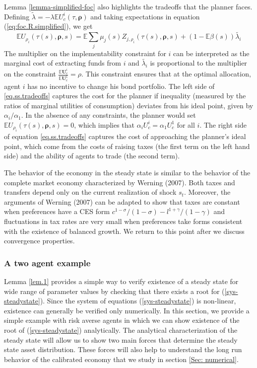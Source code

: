 \documentclass[thmsb,11pt]{article}
\begin{document}
Lemma \ref{lemma-simplified-foc} also highlights the tradeoffs that the planner faces.  Defining $\tilde{\lambda}=-\lambda \mathbb{E} U^i_c(\tau,\bm \rho)$ and taking expectations in equation (\ref{eq:foc.R.simplified}), we get
\begin{equation}
\label{eq.ss.tradeoffs}
\mathbb{E} U_{\rho_i}(\tau(s),\bm \rho,s)= \mathbb{E} \sum_j\mu_j(s)Z_{j,\rho_i}(\tau(s),\bm \rho,s) + (1-\mathbb{E}\beta(s))\tilde{\lambda_i}
\end{equation}
The multiplier on the implementability constraint for $i$ can be interpreted as the marginal cost of extracting funds from $i$  and $\tilde{\lambda_i}$ is proportional to the multiplier on the constraint $\frac{\mathbb{E}\bm{U}^i_c}{\mathbb{E}\bm{U}^1_c}=\rho$. This constraint ensures that at the optimal allocation, agent $i$ has no  incentive to change his bond portfolio. The left side of \eqref{eq.ss.tradeoffs} captures the cost for the planner if inequality (measured by the ratios of marginal utilities of consumption) deviates from his ideal point, given by $\alpha_i/\alpha_1$. In the absence of any constraints, the planner would set $\mathbb{E} U_{\rho_i}(\tau(s),\bm \rho,s)=0$, which implies that $\alpha_i U^i_c = \alpha_1 U^1_c$ for all $i$. The right  side of equation \eqref{eq.ss.tradeoffs} captures the cost of approaching the planner's ideal point, which come from the costs of raising taxes (the first term on the left hand side) and the ability of
agents to trade (the second term).

The behavior of the economy in the steady state is similar to the behavior of the complete market economy characterized by Werning (2007). Both taxes and transfers depend only on the current realization of shock $s_t$. Moreover, the arguments of Werning (2007) can be adapted  to show that taxes are constant when preferences have a CES form $c^{1-\sigma}/(1-\sigma) - l^{1+\gamma}/(1-\gamma) $ and fluctuations in tax rates are very small when preferences take forms consistent with the existence of  balanced growth. We return to this point after we discuss convergence properties.

\subsubsection{A two agent example}\label{sec: 2 agent example}

Lemma \ref{lem.1} provides a simple way to verify existence of a steady state for wide range of parameter values by checking that there exists a root for (\ref{sys-steadystate}). Since the system of equations (\ref{sys-steadystate}) is non-linear, existence can generally be verified only numerically. In this section, we provide a simple example with risk averse agents in which we can show existence of the root of (\ref{sys-steadystate}) analytically. The analytical characterization of the steady state will allow us to show two main forces that determine the steady state asset distribution. These forces will also help to understand the long run behavior of the calibrated economy that we study in section \ref{Sec: numerical}.
\end{document}
